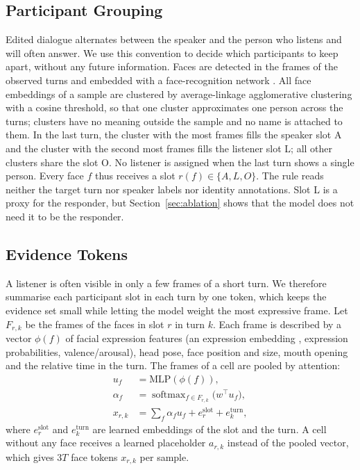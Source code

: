 \documentclass[11pt]{article}
\begin{document}
\subsection{Participant Grouping}
\label{sec:roles}

Edited dialogue alternates between the speaker and the person who listens and will often answer. We use this
convention to decide which participants to keep apart, without any future information. Faces are detected in the
frames of the observed turns and embedded with a face-recognition network \citep{deng2019arcface}. All face embeddings
of a sample are clustered by average-linkage agglomerative clustering with a cosine threshold, so that one cluster
approximates one person across the turns; clusters have no meaning outside the sample and no name is attached to
them. In the last turn, the cluster with the most frames fills the speaker slot A and the cluster with the second
most frames fills the listener slot L; all other clusters share the slot O. No listener is assigned when the last turn
shows a single person. Every face $f$ thus receives a slot $r(f) \in \{A, L, O\}$. The rule reads neither the target
turn nor speaker labels nor identity annotations. Slot L is a proxy for the responder, but
Section~\ref{sec:ablation} shows that the model does not need it to be the responder.

\subsection{Evidence Tokens}
\label{sec:tokens}

A listener is often visible in only a few frames of a short turn. We therefore summarise each participant slot in each
turn by one token, which keeps the evidence set small while letting the model weight the most expressive frame. Let
$F_{r,k}$ be the frames of the faces in slot $r$ in turn $k$. Each frame is described by a vector $\phi(f)$ of facial
expression features (an expression embedding \citep{savchenko2022hsemotion}, expression probabilities,
valence/arousal), head pose, face position and size, mouth opening and the relative time in the turn. The frames of a
cell are pooled by attention:
\begin{equation}
\begin{split}
u_f &= \mathrm{MLP}(\phi(f)),\\
\alpha_f &= \operatorname{softmax}_{f \in F_{r,k}}\!\big(w^\top u_f\big),\\
x_{r,k} &= \textstyle\sum_f \alpha_f u_f + e^{\text{slot}}_r + e^{\text{turn}}_k ,
\end{split}
\end{equation}
where $e^{\text{slot}}_r$ and $e^{\text{turn}}_k$ are learned embeddings of the slot and the turn. A cell without any
face receives a learned placeholder $a_{r,k}$ instead of the pooled vector, which gives $3T$ face tokens $x_{r,k}$
per sample.
\end{document}
